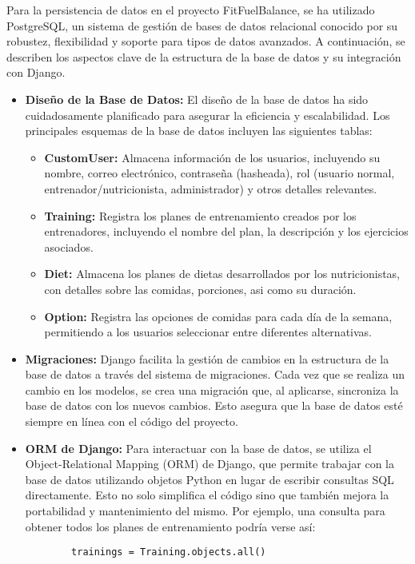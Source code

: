 Para la persistencia de datos en el proyecto FitFuelBalance, se ha utilizado PostgreSQL, un sistema de gestión de bases de datos relacional conocido por su robustez, flexibilidad y soporte para tipos de datos avanzados. A continuación, se describen los aspectos clave de la estructura de la base de datos y su integración con Django.

\begin{itemize}
    \item \textbf{Diseño de la Base de Datos:} El diseño de la base de datos ha sido cuidadosamente planificado para asegurar la eficiencia y escalabilidad. Los principales esquemas de la base de datos incluyen las siguientes tablas:
    \begin{itemize}
        \item \textbf{CustomUser:} Almacena información de los usuarios, incluyendo su nombre, correo electrónico, contraseña (hasheada), rol (usuario normal, entrenador/nutricionista, administrador) y otros detalles relevantes.
        \item \textbf{Training:} Registra los planes de entrenamiento creados por los entrenadores, incluyendo el nombre del plan, la descripción y los ejercicios asociados.
        \item \textbf{Diet:} Almacena los planes de dietas desarrollados por los nutricionistas, con detalles sobre las comidas, porciones, asi como su duración.
        \item \textbf{Option:} Registra las opciones de comidas para cada día de la semana, permitiendo a los usuarios seleccionar entre diferentes alternativas.
    \end{itemize}

    \item \textbf{Migraciones:} Django facilita la gestión de cambios en la estructura de la base de datos a través del sistema de migraciones. Cada vez que se realiza un cambio en los modelos, se crea una migración que, al aplicarse, sincroniza la base de datos con los nuevos cambios. Esto asegura que la base de datos esté siempre en línea con el código del proyecto.

    \item \textbf{ORM de Django:} Para interactuar con la base de datos, se utiliza el Object-Relational Mapping (ORM) de Django, que permite trabajar con la base de datos utilizando objetos Python en lugar de escribir consultas SQL directamente. Esto no solo simplifica el código sino que también mejora la portabilidad y mantenimiento del mismo. Por ejemplo, una consulta para obtener todos los planes de entrenamiento podría verse así:
    \begin{verbatim}
        trainings = Training.objects.all()
    \end{verbatim}


\end{itemize}
